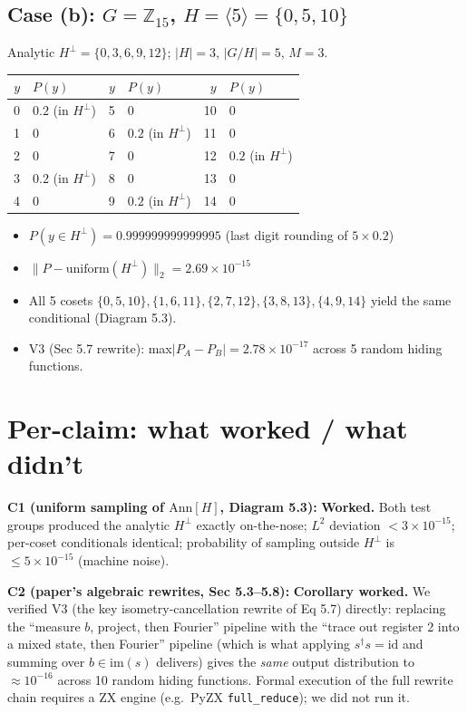 \documentclass[11pt]{article}
\begin{document}
\subsection{Case (b): $G = \mathbb{Z}_{15}$, $H = \langle 5\rangle = \{0,5,10\}$}
Analytic $H^\perp = \{0, 3, 6, 9, 12\}$; $|H|=3$, $|G/H|=5$, $M=3$.
\begin{center}
\begin{tabular}{rlrlrl}
\toprule
$y$ & $P(y)$ & $y$ & $P(y)$ & $y$ & $P(y)$ \\
\midrule
0  & $0.2$ (in $H^\perp$) & 5 & $0$                     & 10 & $0$ \\
1  & $0$                  & 6 & $0.2$ (in $H^\perp$)    & 11 & $0$ \\
2  & $0$                  & 7 & $0$                     & 12 & $0.2$ (in $H^\perp$) \\
3  & $0.2$ (in $H^\perp$) & 8 & $0$                     & 13 & $0$ \\
4  & $0$                  & 9 & $0.2$ (in $H^\perp$)    & 14 & $0$ \\
\bottomrule
\end{tabular}
\end{center}
\begin{itemize}
\item $P(y \in H^\perp) = 0.999999999999995$ (last digit rounding of $5 \times 0.2$)
\item $\|P - \mathrm{uniform}(H^\perp)\|_2 = 2.69 \times 10^{-15}$
\item All 5 cosets $\{0,5,10\}, \{1,6,11\}, \{2,7,12\}, \{3,8,13\}, \{4,9,14\}$
      yield the same conditional (Diagram 5.3).
\item V3 (Sec 5.7 rewrite): max$|P_A - P_B| = 2.78 \times 10^{-17}$ across 5 random hiding functions.
\end{itemize}

\section{Per-claim: what worked / what didn't}

\textbf{C1 (uniform sampling of $\mathrm{Ann}[H]$, Diagram 5.3):} \textbf{Worked.}
Both test groups produced the analytic $H^\perp$ exactly on-the-nose; $L^2$ deviation
$< 3\times 10^{-15}$; per-coset conditionals identical; probability of sampling outside
$H^\perp$ is $\le 5\times 10^{-15}$ (machine noise).

\textbf{C2 (paper's algebraic rewrites, Sec 5.3--5.8):} \textbf{Corollary worked.}
We verified V3 (the key isometry-cancellation rewrite of Eq 5.7) directly: replacing the
``measure $b$, project, then Fourier'' pipeline with the ``trace out register 2 into a mixed
state, then Fourier'' pipeline (which is what applying $s^\dagger s = \mathrm{id}$ and summing
over $b \in \mathrm{im}(s)$ delivers) gives the \emph{same} output distribution to $\approx 10^{-16}$
across 10 random hiding functions. Formal execution of the full rewrite chain requires a ZX
engine (e.g.\ PyZX \texttt{full\_reduce}); we did not run it.
\end{document}
